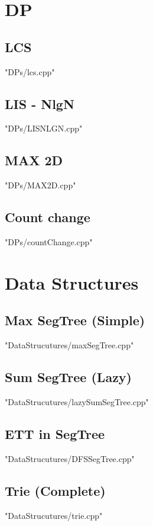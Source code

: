 \documentclass [12pt,twocolumn,oneside]{article}
\begin{document}
\newpage
\section{DP}

\subsection{ LCS}
 {"DPs/lcs.cpp"}

\subsection{ LIS - NlgN}
 {"DPs/LISNLGN.cpp"}

\subsection{ MAX 2D}
 {"DPs/MAX2D.cpp"}

\subsection{ Count change}
 {"DPs/countChange.cpp"}


\newpage
\section{Data Structures}

\subsection{ Max SegTree (Simple)}
 {"DataStrucutures/maxSegTree.cpp"}

\subsection{ Sum SegTree (Lazy)}
 {"DataStrucutures/lazySumSegTree.cpp"}

\subsection{ ETT in SegTree}
 {"DataStrucutures/DFSSegTree.cpp"}

\subsection{ Trie (Complete)}
 {"DataStrucutures/trie.cpp"}
\end{document}
